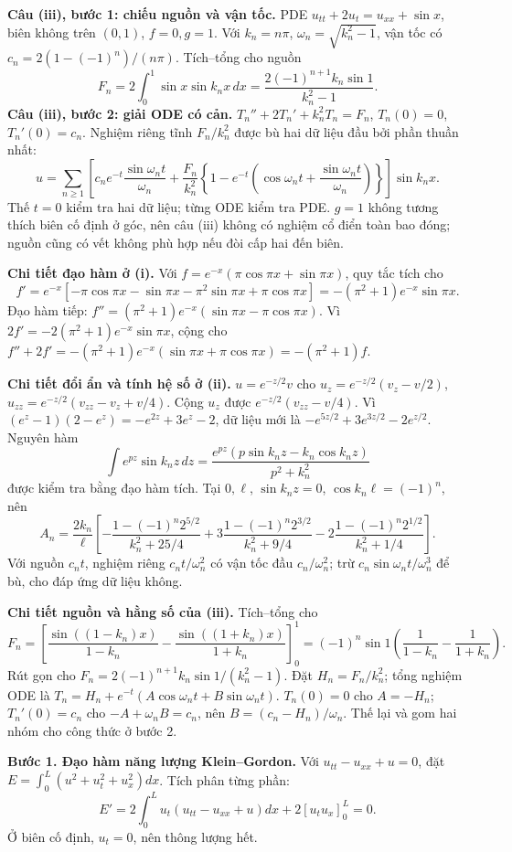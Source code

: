 \textbf{Câu (iii), bước 1: chiếu nguồn và vận tốc.} PDE $u_{tt}+2u_t=u_{xx}+\sin x$, biên không trên $(0,1)$, $f=0,g=1$. Với $k_n=n\pi$, $\omega_n=\sqrt{k_n^2-1}$, vận tốc có $c_n=2(1-(-1)^n)/(n\pi)$. Tích–tổng cho nguồn
\[F_n=2\int_0^1\sin x\sin k_nx\,dx=\frac{2(-1)^{n+1}k_n\sin1}{k_n^2-1}.\]
\textbf{Câu (iii), bước 2: giải ODE có cản.} $T_n''+2T_n'+k_n^2T_n=F_n$, $T_n(0)=0$, $T_n'(0)=c_n$. Nghiệm riêng tĩnh $F_n/k_n^2$ được bù hai dữ liệu đầu bởi phần thuần nhất:
\[u=\sum_{n\ge1}\left[c_ne^{-t}\frac{\sin\omega_nt}{\omega_n}+\frac{F_n}{k_n^2}\left\{1-e^{-t}\left(\cos\omega_nt+\frac{\sin\omega_nt}{\omega_n}\right)\right\}\right]\sin k_nx.\]
Thế $t=0$ kiểm tra hai dữ liệu; từng ODE kiểm tra PDE. $g=1$ không tương thích biên cố định ở góc, nên câu (iii) không có nghiệm cổ điển toàn bao đóng; nguồn cũng có vết không phù hợp nếu đòi cấp hai đến biên.

\textbf{Chi tiết đạo hàm ở (i).} Với $f=e^{-x}(\pi\cos\pi x+\sin\pi x)$, quy tắc tích cho
\[f'=e^{-x}[-\pi\cos\pi x-\sin\pi x-\pi^2\sin\pi x+\pi\cos\pi x]
=-(\pi^2+1)e^{-x}\sin\pi x.\]
Đạo hàm tiếp: $f''=(\pi^2+1)e^{-x}(\sin\pi x-\pi\cos\pi x)$. Vì $2f'=-2(\pi^2+1)e^{-x}\sin\pi x$, cộng cho $f''+2f'=-(\pi^2+1)e^{-x}(\sin\pi x+\pi\cos\pi x)=-(\pi^2+1)f$.

\textbf{Chi tiết đổi ẩn và tính hệ số ở (ii).} $u=e^{-z/2}v$ cho $u_z=e^{-z/2}(v_z-v/2)$, $u_{zz}=e^{-z/2}(v_{zz}-v_z+v/4)$. Cộng $u_z$ được $e^{-z/2}(v_{zz}-v/4)$. Vì $(e^z-1)(2-e^z)=-e^{2z}+3e^z-2$, dữ liệu mới là $-e^{5z/2}+3e^{3z/2}-2e^{z/2}$. Nguyên hàm
\[\int e^{pz}\sin k_nz\,dz=
\frac{e^{pz}(p\sin k_nz-k_n\cos k_nz)}{p^2+k_n^2}\]
được kiểm tra bằng đạo hàm tích. Tại $0,\ell$, $\sin k_nz=0$, $\cos k_n\ell=(-1)^n$, nên
\[A_n=\frac{2k_n}{\ell}\left[
-\frac{1-(-1)^n2^{5/2}}{k_n^2+25/4}
+3\frac{1-(-1)^n2^{3/2}}{k_n^2+9/4}
-2\frac{1-(-1)^n2^{1/2}}{k_n^2+1/4}\right].\]
Với nguồn $c_nt$, nghiệm riêng $c_nt/\omega_n^2$ có vận tốc đầu $c_n/\omega_n^2$; trừ $c_n\sin\omega_nt/\omega_n^3$ để bù, cho đáp ứng dữ liệu không.

\textbf{Chi tiết nguồn và hằng số của (iii).} Tích–tổng cho
\[F_n=\left[\frac{\sin((1-k_n)x)}{1-k_n}
-\frac{\sin((1+k_n)x)}{1+k_n}\right]_0^1
=(-1)^n\sin1\left(\frac1{1-k_n}-\frac1{1+k_n}\right).\]
Rút gọn cho $F_n=2(-1)^{n+1}k_n\sin1/(k_n^2-1)$. Đặt $H_n=F_n/k_n^2$; tổng nghiệm ODE là $T_n=H_n+e^{-t}(A\cos\omega_nt+B\sin\omega_nt)$. $T_n(0)=0$ cho $A=-H_n$; $T_n'(0)=c_n$ cho $-A+\omega_nB=c_n$, nên $B=(c_n-H_n)/\omega_n$. Thế lại và gom hai nhóm cho công thức ở bước 2.

\textbf{Bước 1. Đạo hàm năng lượng Klein–Gordon.} Với $u_{tt}-u_{xx}+u=0$, đặt $E=\int_0^L(u^2+u_t^2+u_x^2)dx$. Tích phân từng phần:
\[E'=2\int_0^Lu_t(u_{tt}-u_{xx}+u)dx+2[u_tu_x]_0^L=0.\]
Ở biên cố định, $u_t=0$, nên thông lượng hết.

